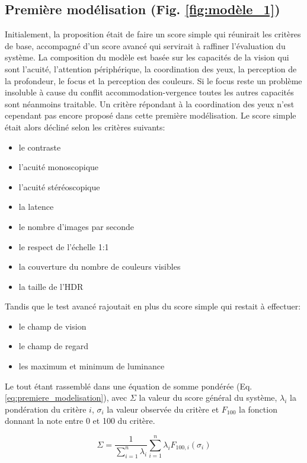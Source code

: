 	\subsection{Première modélisation (Fig. \ref{fig:modèle_1})}
	\par Initialement, la proposition était de faire un score simple qui réunirait les critères de base, accompagné d'un score avancé qui servirait à raffiner l'évaluation du système. La composition du modèle est basée sur les capacités de la vision qui sont l'acuité, l'attention périphérique, la coordination des yeux, la perception de la profondeur, le focus et la perception des couleurs. Si le focus reste un problème insoluble à cause du conflit accommodation-vergence toutes les autres capacités sont néanmoins traitable. Un critère répondant à la coordination des yeux n'est cependant pas encore proposé dans cette première modélisation. Le score simple était alors décliné selon les critères suivants:
	\begin{itemize}
		\item le contraste
		\item l'acuité monoscopique
		\item l'acuité stéréoscopique
		\item la latence
		\item le nombre d'images par seconde
		\item le respect de l'échelle 1:1
		\item la couverture du nombre de couleurs visibles
		\item la taille de l'HDR
	\end{itemize}
	Tandis que le test avancé rajoutait en plus du score simple qui restait à effectuer:
	\begin{itemize}
		\item le champ de vision
		\item le champ de regard
		\item les maximum et minimum de luminance
	\end{itemize}
	Le tout étant rassemblé dans une équation de somme pondérée (Eq. \ref{eq:premiere_modelisation}), avec $\Sigma$ la valeur du score général du système, $\lambda_i$ la pondération du critère $i$, $\sigma_i$ la valeur observée du critère et $F_{100}$ la fonction donnant la note entre 0 et 100 du critère. 
	
	\begin{equation}
		\Sigma = \frac{1}{\sum_{i = 1}^{n} \lambda_i} \sum_{i = 1}^{n} \lambda_i F_{100,i}(\sigma_i)
		\label{eq:premiere_modelisation}
	\end{equation}
	
